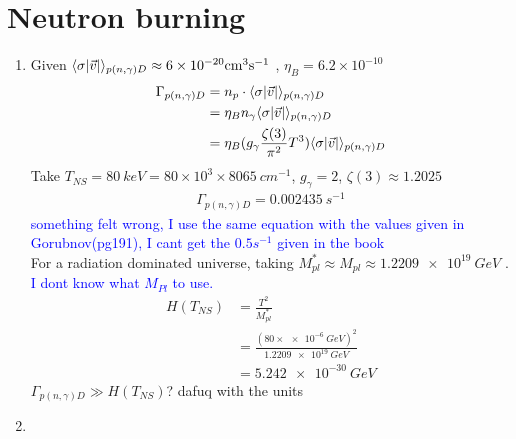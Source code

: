 \section{Neutron burning}
\begin{enumerate}[label=\alph*)]
\item Given $\langle\sigma \abs{\vec{v}} \rangle_{p(n,\gamma)D} \approx 6\times\SI{}{10^{-20} cm^3 s^{-1}}$ , $\eta_B = 6.2 \times 10^{-10}$
\begin{align}
\Gamma_{p(n,\gamma)D} &= n_p \cdot \langle\sigma \abs{\vec{v}} \rangle_{p(n,\gamma)D} \\
	&= \eta_B n_\gamma  \langle\sigma \abs{\vec{v}} \rangle_{p(n,\gamma)D} \nonumber \\ 
	&= \eta_B (g_\gamma \frac{\zeta(3)}{\pi^2}T^3)\langle\sigma \abs{\vec{v}} \rangle_{p(n,\gamma)D} \nonumber
\end{align}
Take $T_{NS} = \SI{80}{keV} =  80 \times 10^3 \times 8065\SI{}{cm^{-1}} $, $g_\gamma = 2$, $\zeta(3) \approx 1.2025$
\begin{align}
\Gamma_{p(n,\gamma)D} = \SI{0.002435}{s^{-1}} 
\end{align}
\textcolor{blue}{something felt wrong, I use the same equation with the values given in Gorubnov(pg191), I cant get the $0.5s^{-1}$ given in the book}\\
For a radiation dominated universe, taking $M^{\ast}_{pl} \approx M_{pl} \approx \SI{1.2209 e19}{GeV}$ . \textcolor{blue}{I dont know what $M_{Pl}$ to use.}
\begin{align}
H(T_{NS}) 	&= \frac{T^2}{M^{\ast}_{pl}} \nonumber \\
	&= \frac{(80\times \SI{e-6}{GeV})^2}{\SI{1.2209 e19}{GeV}} \nonumber  \\
	&= \SI{5.242e-30}{GeV}
\end{align}
$\Gamma_{p(n,\gamma)D} \gg H(T_{NS})$? dafuq with the units 

\item 

\end{enumerate}

